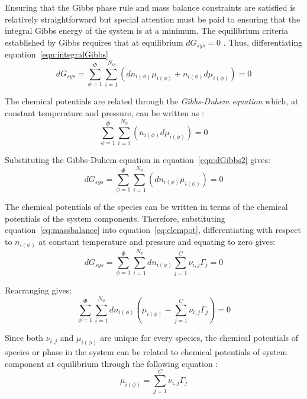 		Ensuring that the Gibbs phase rule and mass balance constraints are satisfied is relatively straightforward but special attention must be paid to ensuring that the integral Gibbs energy of the system is at a minimum. The equilibrium criteria established by Gibbs requires that at equilibrium $d G_{sys} = 0$ \cite{Gibbs:1878aa}. Thus, differentiating equation~\ref{eqn:integralGibbs}
		\begin{equation}\label{eqn:dGibbs1}
			d G_{sys} = \sum_{\phi=1}^{\Phi} \sum_{i=1}^{N_{\phi}} \left( d n_{i(\phi)}\mu_{i(\phi)} + n_{i(\phi)} d \mu_{i(\phi)}\right) = 0
		\end{equation}

		The chemical potentials are related through the \emph{Gibbs-Duhem equation} which, at constant temperature and pressure, can be written as \cite{Olander08}:
		\begin{equation}\label{eqn:dGibbs2}
			\sum_{\phi=1}^{\Phi} \sum_{i=1}^{N_{\phi}} \left( n_{i(\phi)} d \mu_{i(\phi)}\right) = 0
		\end{equation}

		Substituting the Gibbs-Duhem equation in equation~\ref{eqn:dGibbs2} gives:
		\begin{equation}\label{eqn:dGibbs3}
			d G_{sys} = \sum_{\phi=1}^{\Phi} \sum_{i=1}^{N_{\phi}} \left( d n_{i(\phi)}\mu_{i(\phi)} \right) = 0
		\end{equation}

		The chemical potentials of the species can be written in terms of the chemical potentials of the system components. Therefore, substituting equation~\ref{eq:massbalance} into equation~\ref{eq:elempot}, differentiating with respect to $n_{i(\phi)}$ at constant temperature and pressure and equating to zero gives:
		\begin{equation}\label{eqn:dGibbs4}
			d G_{sys} = \sum_{\phi=1}^{\Phi} \sum_{i=1}^{N_{\phi}}  d n_{i(\phi)}\sum_{j=1}^{C}\nu_{i,j}\Gamma_j  = 0
		\end{equation}

		Rearranging gives:
		\begin{equation}\label{eqn:dGibbs5}
			\sum_{\phi=1}^{\Phi} \sum_{i=1}^{N_{\phi}}  d n_{i(\phi)} \left( \mu_{i(\phi)} - \sum_{j=1}^{C}\nu_{i,j}\Gamma_j \right) = 0
		\end{equation}

		Since both $\nu_{i,j}$ and $\mu_{i(\phi)}$ are unique for every species, the chemical potentials of species or phase in the system can be related to chemical potentials of system component at equilibrium through the following equation \cite{vanZeggeren11}:
		\begin{equation}\label{eqn:dGibbs6}
			\mu_{i(\phi)} = \sum_{j=1}^{C}\nu_{i,j}\Gamma_j
		\end{equation}


